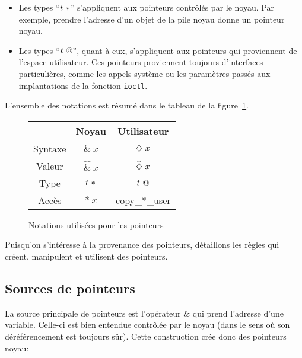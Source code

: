\begin{itemize}

\item Les types ``$\ptrK{t}$'' s'appliquent aux pointeurs contrôlés par le
noyau. Par exemple, prendre l'adresse d'un objet de la pile noyau donne un
pointeur noyau.

\item Les types ``$\ptrU{t}$'', quant à eux, s'appliquent aux pointeurs qui
proviennent de l'espace utilisateur. Ces pointeurs proviennent toujours
d'interfaces particulières, comme les appels système ou les paramètres passés
aux implantations de la fonction \texttt{ioctl}.

\end{itemize}

L'ensemble des notations est résumé dans le tableau de la
figure~\ref{fig:qualif-not-resume}.

\begin{figure}
\centering
\begin{tabular}{ccc}
        & Noyau      & Utilisateur \\
\midrule
Syntaxe & $\&~x$     & $\eTaint{x}$ \\
Valeur  & $\widehat{\&}~x$ & $\vTainted{x}$ \\
Type    & $\ptrK{t}$ & $\ptrU{t}$ \\
Accès   & $*~x$      & copy\_*\_user \\
\end{tabular}

\caption{Notations utilisées pour les pointeurs}
\label{fig:qualif-not-resume}
\end{figure}

Puisqu'on s'intéresse à la provenance des pointeurs, détaillons les règles qui
créent, manipulent et utilisent des pointeurs.

\subsection*{Sources de pointeurs}

La source principale de pointeurs est l'opérateur $\&$ qui prend l'adresse d'une
variable. Celle-ci est bien entendue contrôlée par le noyau (dans le sens où son
déréférencement est toujours sûr). Cette construction crée donc des pointeurs
noyau:

\begin{mathpar}
\end{mathpar}

